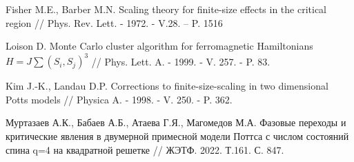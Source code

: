 \begin{thebibliography}{111}
Fisher M.E., Barber M.N. Scaling theory for finite-size effects in the critical region // Phys. Rev. Lett. - 1972. - V.28. -- P. 1516

Loison D. Monte Carlo cluster algorithm for ferromagnetic Hamiltonians $H = J\sum(S_i, S_j)^3$ // Phys. Lett. A. - 1999. - V. 257. - P. 83.

Kim J.-K., Landau D.P. Corrections to finite-size-scaling in two dimensional Potts models // Physica A. - 1998. - V. 250. - P. 362.

Муртазаев А.К., Бабаев А.Б., Атаева Г.Я., Магомедов М.А. Фазовые переходы и критические явления в двумерной примесной модели Поттса с числом состояний спина q=4 на квадратной решетке // ЖЭТФ. 2022. Т.161. С. 847.






\end{thebibliography} 